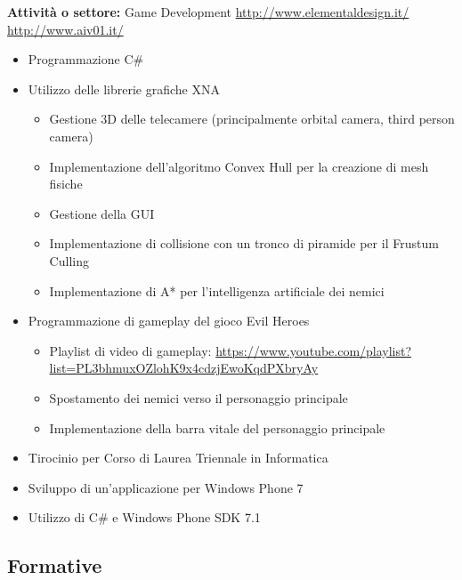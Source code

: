\documentclass[11pt,a4paper,sans]{moderncv} %
\begin{document}
{
	\textbf{Attivit\`{a} o settore:} Game Development
	\newline{}
	\url{http://www.elementaldesign.it/}
	\newline{}
	\url{http://www.aiv01.it/} 
	\begin{itemize}
		\item Programmazione C\#
		\item Utilizzo delle librerie grafiche XNA
		\begin{itemize}
			\item Gestione 3D delle telecamere (principalmente orbital camera, third person camera)
			\item Implementazione dell'algoritmo Convex Hull per la creazione di mesh fisiche
			\item Gestione della GUI
			\item Implementazione di collisione con un tronco di piramide per il Frustum Culling
			\item Implementazione di A* per l'intelligenza artificiale dei nemici
		\end{itemize}
		\item Programmazione di gameplay del gioco Evil Heroes
		\begin{itemize}
			\item Playlist di video di gameplay:
			\newline{}
			\url{https://www.youtube.com/playlist?list=PL3bhmuxOZlohK9x4cdzjEwoKqdPXbryAy}
			\item Spostamento dei nemici verso il personaggio principale
			\item Implementazione della barra vitale del personaggio principale
		\end{itemize}
	\end{itemize}
}

{
	\begin{itemize}
		\item Tirocinio per Corso di Laurea Triennale in Informatica
		\item Sviluppo di un'applicazione per Windows Phone 7
		\item Utilizzo di C\# e Windows Phone SDK 7.1
	\end{itemize}
}

\clearpage
\subsection{Formative}
\end{document}
